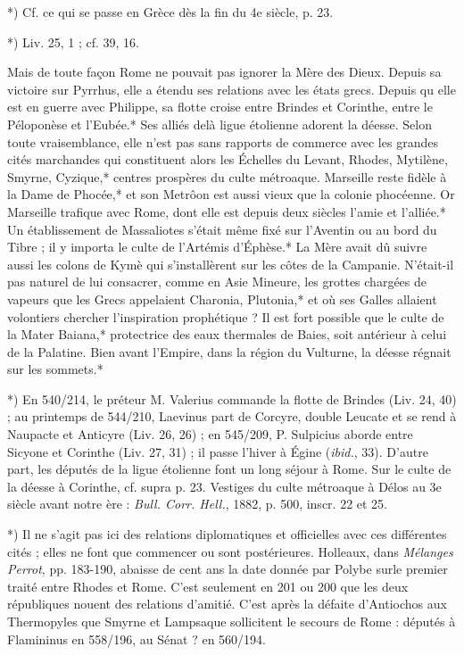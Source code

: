 \documentclass[a4paper, 11pt, oneside, polutonikogreek, french]{article}
\begin{document}
*) Cf. ce qui se passe en Grèce dès la fin du 4e siècle, p. 23.

*) Liv. 25, 1 ; cf. 39, 16.

Mais de toute façon Rome ne pouvait pas ignorer la Mère des Dieux. Depuis sa victoire sur Pyrrhus, elle a étendu ses relations avec les états grecs. Depuis qu elle est en guerre avec Philippe, sa flotte croise entre Brindes et Corinthe, entre le Péloponèse et l'Eubée.* Ses alliés delà ligue étolienne adorent la déesse. Selon toute vraisemblance, elle n'est pas sans rapports de commerce avec les grandes cités marchandes qui constituent alors les Échelles du Levant, Rhodes, Mytilène, Smyrne, Cyzique,* centres prospères du culte métroaque. Marseille reste fidèle à la Dame de Phocée,* et son Metrôon est aussi vieux que la colonie phocéenne. Or Marseille trafique avec Rome, dont elle est depuis deux siècles l'amie et l'alliée.* Un établissement de Massaliotes s'était même fixé sur l'Aventin ou au bord du Tibre ; il y importa le culte de l'Artémis d'Éphèse.* La Mère avait dû suivre aussi les colons de Kymè qui s'installèrent sur les côtes de la Campanie. N'était-il pas naturel de lui consacrer, comme en Asie Mineure, les grottes chargées de vapeurs que les Grecs appelaient Charonia, Plutonia,* et où ses Galles allaient volontiers chercher l'inspiration prophétique ? Il est fort possible que le culte de la Mater Baiana,* protectrice des eaux thermales de Baies, soit antérieur à celui de la Palatine. Bien avant l'Empire, dans la région du Vulturne, la déesse régnait sur les sommets.*

*) En 540/214, le préteur M. Valerius commande la flotte de Brindes (Liv. 24, 40) ; au printemps de 544/210, Laevinus part de Corcyre, double Leucate et se rend à Naupacte et Anticyre (Liv. 26, 26) ; en 545/209, P. Sulpicius aborde entre Sicyone et Corinthe (Liv. 27, 31) ; il passe l'hiver à Égine (\emph{ibid.}, 33). D'autre part, les députés de la ligue étolienne font un long séjour à Rome. Sur le culte de la déesse à Corinthe, cf. supra p. 23. Vestiges du culte métroaque à Délos au 3e siècle avant notre ère : \emph{Bull. Corr. Hell.}, 1882, p. 500, inscr. 22 et 25.

*) Il ne s'agit pas ici des relations diplomatiques et officielles avec ces différentes cités ; elles ne font que commencer ou sont postérieures. Holleaux, dans \emph{Mélanges Perrot}, pp. 183-190, abaisse de cent ans la date donnée par Polybe surle premier traité entre Rhodes et Rome. C'est seulement en 201 ou 200 que les deux républiques nouent des relations d'amitié. C'est après la défaite d'Antiochos aux Thermopyles que Smyrne et Lampsaque sollicitent le secours de Rome : députés à Flamininus en 558/196, au Sénat ? en 560/194.
\end{document}
